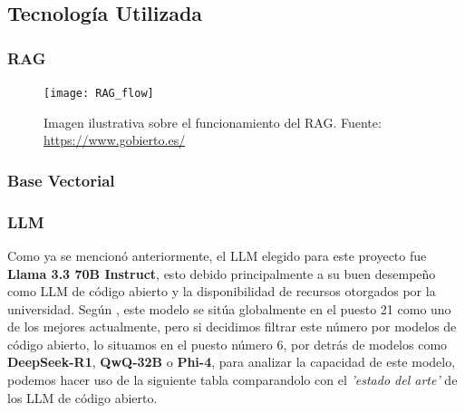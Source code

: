 \documentclass{article}
\begin{document}
\subsection{Tecnología Utilizada}

\subsubsection{RAG}

\begin{figure}[h!]
\centering
\texttt{[image: RAG\_flow]}
\caption{Imagen ilustrativa sobre el funcionamiento del RAG. Fuente: \url{https://www.gobierto.es/}}
\label{fig:RAG_flow}
\end{figure}

\subsubsection{Base Vectorial} 
\subsubsection{LLM} \label{LLM}
Como ya se mencionó anteriormente, el LLM elegido para este proyecto fue \textbf{Llama 3.3 70B Instruct}, esto debido principalmente a su buen desempeño como LLM de código abierto y la disponibilidad de recursos otorgados por la universidad. 
Según \cite{llm-stats}, este modelo se sitúa globalmente en el puesto 21 como uno de los mejores actualmente, pero si decidimos filtrar este número por modelos de código abierto, lo situamos en el puesto número 6, por detrás de modelos como \textbf{DeepSeek-R1}, \textbf{QwQ-32B} o \textbf{Phi-4}, para analizar la capacidad de este modelo, podemos hacer uso de la siguiente tabla comparandolo con el \textit{'estado del arte'} de los LLM de código abierto. 

\begin{table}[H]
\centering
{}
\caption{Comparativa}
\label{tab:comparativa_llm}
\end{table}
\end{document}
